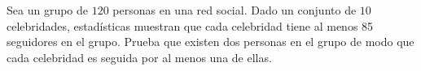 
\begin{problem}
	Sea un grupo de $120$ personas en una red social. Dado un conjunto de $10$ celebridades, estadísticas muestran que cada celebridad tiene al menos 85 seguidores en el grupo. Prueba que existen dos personas en el grupo de modo que cada celebridad es seguida por al menos una de ellas.
\end{problem}
